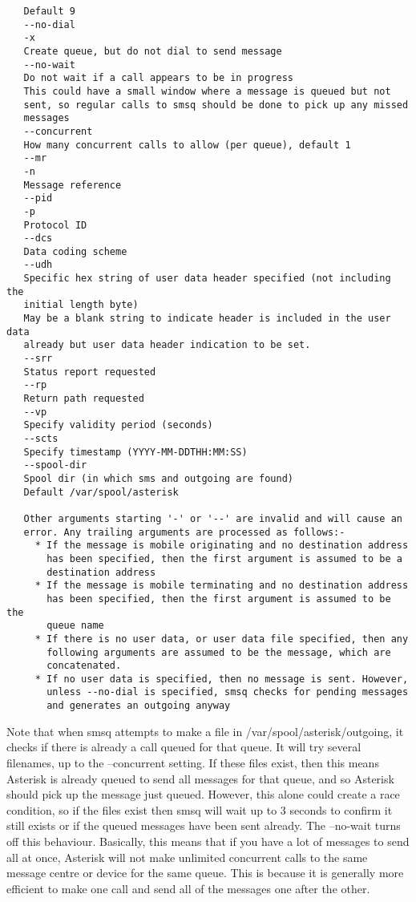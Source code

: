 \begin{verbatim}
   Default 9
   --no-dial
   -x
   Create queue, but do not dial to send message
   --no-wait
   Do not wait if a call appears to be in progress
   This could have a small window where a message is queued but not
   sent, so regular calls to smsq should be done to pick up any missed
   messages
   --concurrent
   How many concurrent calls to allow (per queue), default 1
   --mr
   -n
   Message reference
   --pid
   -p
   Protocol ID
   --dcs
   Data coding scheme
   --udh
   Specific hex string of user data header specified (not including the
   initial length byte)
   May be a blank string to indicate header is included in the user data
   already but user data header indication to be set.
   --srr
   Status report requested
   --rp
   Return path requested
   --vp
   Specify validity period (seconds)
   --scts
   Specify timestamp (YYYY-MM-DDTHH:MM:SS)
   --spool-dir
   Spool dir (in which sms and outgoing are found)
   Default /var/spool/asterisk

   Other arguments starting '-' or '--' are invalid and will cause an
   error. Any trailing arguments are processed as follows:-
     * If the message is mobile originating and no destination address
       has been specified, then the first argument is assumed to be a
       destination address
     * If the message is mobile terminating and no destination address
       has been specified, then the first argument is assumed to be the
       queue name
     * If there is no user data, or user data file specified, then any
       following arguments are assumed to be the message, which are
       concatenated.
     * If no user data is specified, then no message is sent. However,
       unless --no-dial is specified, smsq checks for pending messages
       and generates an outgoing anyway
\end{verbatim}

   Note that when smsq attempts to make a file in
   /var/spool/asterisk/outgoing, it checks if there is already a call
   queued for that queue. It will try several filenames, up to the
   --concurrent setting. If these files exist, then this means Asterisk
   is already queued to send all messages for that queue, and so Asterisk
   should pick up the message just queued. However, this alone could
   create a race condition, so if the files exist then smsq will wait up
   to 3 seconds to confirm it still exists or if the queued messages have
   been sent already. The --no-wait turns off this behaviour. Basically,
   this means that if you have a lot of messages to send all at once,
   Asterisk will not make unlimited concurrent calls to the same message
   centre or device for the same queue. This is because it is generally
   more efficient to make one call and send all of the messages one after
   the other.

